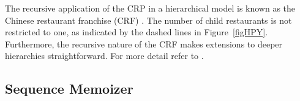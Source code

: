%
%
The recursive application of the CRP in a hierarchical model is known as the Chinese restaurant franchise (CRF) \cite{Teh2006b}.  The number of child restaurants is not restricted to one, as indicated by the dashed lines in Figure~\ref{figHPY}.  Furthermore, the recursive nature of the CRF makes extensions to deeper hierarchies straightforward. For more detail refer to \cite{Teh2006b, Teh2006a}.

\subsection{Sequence Memoizer}
\label{sec:sm}

